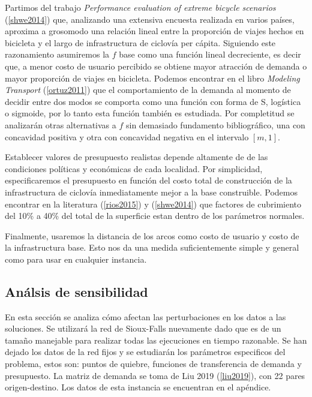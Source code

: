 \documentclass{article}
\begin{document}
  Partimos del trabajo {\it Performance evaluation of extreme bicycle scenarios} (\ref{shwe2014}) que, analizando una extensiva encuesta realizada en varios países, aproxima a grosomodo una relación lineal entre la proporción de viajes hechos en bicicleta y el largo de infrastructura de ciclovía per cápita. Siguiendo este razonamiento asumiremos la $f$ base como una función lineal decreciente, es decir que, a menor costo de usuario percibido se obtiene mayor atracción de demanda o mayor proporción de viajes en bicicleta. Podemos encontrar en el libro {\it Modeling Transport} (\ref{ortuz2011}) que el comportamiento de la demanda al momento de decidir entre dos modos se comporta como una función con forma de S, logística o sigmoide, por lo tanto esta función también es estudiada. Por completitud se analizarán otras alternativas a $f$ sin demasiado fundamento bibliográfico, una con concavidad positiva y otra con concavidad negativa en el intervalo $[m, 1]$.

  Establecer valores de presupuesto realistas depende altamente de de las condiciones políticas y económicas de cada localidad. Por simplicidad, especificaremos el presupuesto en función del costo total de construcción de la infrastructura de ciclovía inmediatamente mejor a la base construible. Podemos encontrar en la literatura (\ref{rios2015}) y (\ref{shwe2014}) que factores de cubrimiento del 10\% a 40\% del total de la superficie estan dentro de los parámetros normales.

  Finalmente, usaremos la distancia de los arcos como costo de usuario y costo de la infrastructura base. Esto nos da una medida suficientemente simple y general como para usar en cualquier instancia.

  \subsection*{Análsis de sensibilidad}

  En esta sección se analiza cómo afectan las perturbaciones en los datos a las soluciones. Se utilizará la red de Sioux-Falls nuevamente dado que es de un tamaño manejable para realizar todas las ejecuciones en tiempo razonable. Se han dejado los datos de la red fijos y se estudiarán los parámetros especificos del problema, estos son: puntos de quiebre, funciones de transferencia de demanda y presupuesto. La matriz de demanda se toma de Liu 2019 (\ref{liu2019}), con 22 pares origen-destino. Los datos de esta instancia se encuentran en el apéndice.
\end{document}
